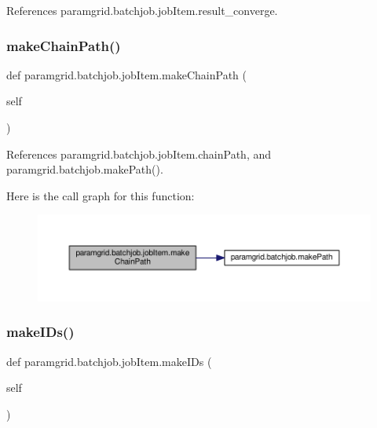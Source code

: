References paramgrid.\+batchjob.\+job\+Item.\+result\+\_\+converge.

\mbox{\label{classparamgrid_1_1batchjob_1_1jobItem_af2b6c516384812d49454f2ee26082f66}} 
\subsubsection{\texorpdfstring{make\+Chain\+Path()}{makeChainPath()}}
{\footnotesize\ttfamily def paramgrid.\+batchjob.\+job\+Item.\+make\+Chain\+Path (\begin{DoxyParamCaption}\item[{}]{self }\end{DoxyParamCaption})}



References paramgrid.\+batchjob.\+job\+Item.\+chain\+Path, and paramgrid.\+batchjob.\+make\+Path().

Here is the call graph for this function\+:
\nopagebreak
\begin{figure}[H]
\begin{center}
\leavevmode
\includegraphics[width=350pt]{classparamgrid_1_1batchjob_1_1jobItem_af2b6c516384812d49454f2ee26082f66_cgraph}
\end{center}
\end{figure}
\mbox{\label{classparamgrid_1_1batchjob_1_1jobItem_a21a745131f1ba6ee8361c6955bedcda0}} 
\subsubsection{\texorpdfstring{make\+I\+Ds()}{makeIDs()}}
{\footnotesize\ttfamily def paramgrid.\+batchjob.\+job\+Item.\+make\+I\+Ds (\begin{DoxyParamCaption}\item[{}]{self }\end{DoxyParamCaption})}

